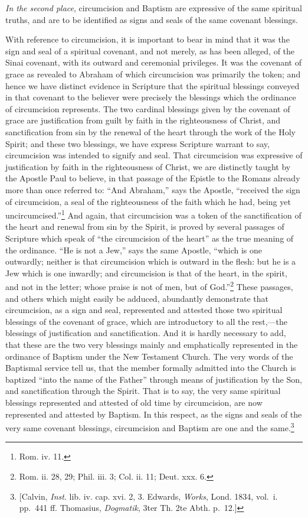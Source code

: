 \documentclass[english,]{book}
\begin{document}
\emph{In the second place}, circumcision and Baptism are expressive of the same spiritual truths, and are to be identified as signs and seals of the same covenant blessings.

With reference to circumcision, it is important to bear in mind that it was the sign and seal of a spiritual covenant, and not merely, as has been alleged, of the Sinai covenant, with its outward and ceremonial privileges. It was the covenant of grace as revealed to Abraham of which circumcision was primarily the token; and hence we have distinct evidence in Scripture that the spiritual blessings conveyed in that covenant to the believer were precisely the blessings which the ordinance of circumcision represents. The two cardinal blessings given by the covenant of grace are justification from guilt by faith in the righteousness of Christ, and sanctification from sin by the renewal of the heart through the work of the Holy Spirit; and these two blessings, we have express Scripture warrant to say, circumcision was intended to signify and seal. That circumcision was expressive of justification by faith in the righteousness of Christ, we are distinctly taught by the Apostle Paul to believe, in that passage of the Epistle to the Romans already more than once referred to: ``And Abraham,'' says the Apostle, ``received the sign of circumcision, a seal of the righteousness of the faith which he had, being yet uncircumcised.''\footnote{Rom. iv. 11.} And again, that circumcision was a token of the sanctification of the heart and renewal from sin by the Spirit, is proved by several passages of Scripture which speak of ``the circumcision of the heart'' as the true meaning of the ordinance. ``He is not a Jew,'' says the same Apostle, ``which is one outwardly; neither is that circumcision which is outward in the flesh: but he is a Jew which is one inwardly; and circumcision is that of the heart, in the spirit, and not in the letter; whose praise is not of men, but of God.''\footnote{Rom. ii. 28, 29; Phil. iii. 3; Col. ii. 11; Deut. xxx. 6.} These passages, and others which might easily be adduced, abundantly demonstrate that circumcision, as a sign and seal, represented and attested those two spiritual blessings of the covenant of grace, which are introductory to all the rest,---the blessings of justification and sanctification. And it is hardly necessary to add, that these are the two very blessings mainly and emphatically represented in the ordinance of Baptism under the New Testament Church. The very words of the Baptismal service tell us, that the member formally admitted into the Church is baptized ``into the name of the Father'' through means of justification by the Son, and sanctification through the Spirit. That is to say, the very same spiritual blessings represented and attested of old time by circumcision, are now represented and attested by Baptism. In this respect, as the signs and seals of the very same covenant blessings, circumcision and Baptism are one and the same.\footnote{{[}Calvin, \emph{Inst}. lib. iv. cap. xvi. 2, 3. Edwards, \emph{Works}, Lond. 1834, vol.~i. pp.~441 ff. Thomasius, \emph{Dogmatik}, 3ter Th. 2te Abth. p.~12.{]}}
\end{document}
